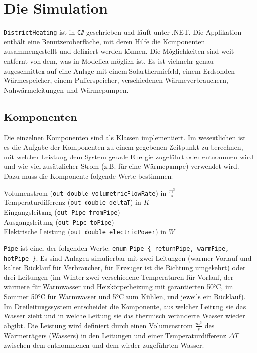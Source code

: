 \documentclass[12pt,a4paper]{article}
\begin{document}
\section{Die Simulation}
\texttt{DistrictHeating} ist in \texttt{C\#} geschrieben und läuft unter .NET. Die Applikation enthält eine Benutzeroberfläche, mit deren Hilfe die Komponenten zusammengestellt und definiert werden können. Die Möglichkeiten sind weit entfernt von dem, was in Modelica möglich ist. Es ist vielmehr genau zugeschnitten auf eine Anlage mit einem Solarthermiefeld, einem Erdsonden-Wärmespeicher, einem Pufferspeicher, verschiedenen Wärmeverbrauchern, Nahwärmeleitungen und Wärmepumpen.
\subsection{Komponenten} Die einzelnen Komponenten sind als Klassen implementiert. Im wesentlichen ist es die Aufgabe der Komponenten zu einem gegebenen Zeitpunkt zu berechnen, mit welcher Leistung dem System gerade Energie zugeführt oder entnommen wird und wie viel zusätzlicher Strom (z.B. für eine Wärmepumpe) verwendet wird. Dazu muss die Komponente folgende Werte bestimmen:
\begin{description}
\item[Volumenstrom (\texttt{out double volumetricFlowRate}) in $\frac{m^3}{s}$]
\item[Temperaturdifferenz (\texttt{out double deltaT}) in $K$]
\item[Eingangsleitung (\texttt{out Pipe fromPipe})]
\item[Ausgangsleitung (\texttt{out Pipe toPipe})]
\item[Elektrische Leistung (\texttt{out double electricPower}) in $W$]
\end{description}
\texttt{Pipe} ist einer der folgenden Werte: \texttt{enum Pipe \{ returnPipe, warmPipe, hotPipe \}}.
Es sind Anlagen simulierbar mit zwei Leitungen (warmer Vorlauf und kalter Rücklauf für Verbraucher, für Erzeuger ist die Richtung umgekehrt) oder drei Leitungen (im Winter zwei verschiedene Temperaturen für Vorlauf, der wärmere für Warmwasser und Heizkörperheizung mit garantierten 50°C, im Sommer 50°C für Warmwasser und 5°C zum Kühlen, und jeweils ein Rücklauf). Im Dreileitungssystem entscheidet die Komponente, aus welcher Leitung sie das Wasser zieht und in welche Leitung sie das thermisch veränderte Wasser wieder abgibt.
Die Leistung wird definiert durch einen Volumenstrom $\frac{m^3}{s}$ des Wärmeträgers (Wassers) in den Leitungen und einer Temperaturdifferenz $\Delta T$ zwischen dem entnommenen und dem wieder zugeführten Wasser.
\end{document}
